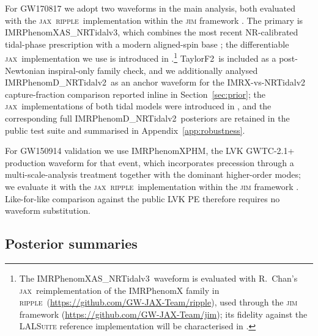 \documentclass[usenatbib]{mnras}
\newcommand{\IMR}{IMRPhenomD\_NRTidalv2\xspace}
\newcommand{\IMRX}{IMRPhenomXAS\_NRTidalv3\xspace}
\newcommand{\XPHM}{IMRPhenomXPHM\xspace}
\newcommand{\TF}{TaylorF2\xspace}
\newcommand{\jax}{\textsc{jax}\xspace}
\newcommand{\ripple}{\textsc{ripple}\xspace}
\begin{document}
For GW170817 we adopt two waveforms in the main analysis, both evaluated with the \jax\ \ripple\ implementation \citep{Edwards2023Ripple} within the \textsc{jim} framework \citep{Wong2023Jim}. The primary is \IMRX, which combines the most recent NR-calibrated tidal-phase prescription \citep[NRTidalv3;][]{Abac2024NRTidalv3} with a modern aligned-spin base \citep[IMRPhenomXAS;][]{Pratten2020XAS}; the differentiable \jax\ implementation we use is introduced in \citet{Chan2026ripple}.\footnote{\raggedright The \IMRX\ waveform is evaluated with R.~Chan's \jax\ reimplementation of the IMRPhenomX family in \ripple\ (\url{https://github.com/GW-JAX-Team/ripple}), used through the \textsc{jim} framework \citep{Wong2023Jim} (\url{https://github.com/GW-JAX-Team/jim}); its fidelity against the \textsc{LALSuite} reference implementation will be characterised in \citet{Chan2026ripple}.} \TF\ is included as a post-Newtonian inspiral-only family check, and we additionally analysed \IMR\ as an anchor waveform for the IMRX-vs-NRTidalv2 capture-fraction comparison reported inline in Section~\ref{sec:prior}; the \jax\ implementations of both tidal models were introduced in \citet{Wouters2024JimBNS}, and the corresponding full \IMR\ posteriors are retained in the public test suite and summarised in Appendix~\ref{app:robustness}.

For GW150914 validation we use \XPHM \citep{Pratten2021XPHM}, the LVK GWTC-2.1+ production waveform for that event, which incorporates precession through a multi-scale-analysis treatment together with the dominant higher-order modes; we evaluate it with the \jax\ \ripple\ implementation \citep{Edwards2023Ripple} within the \textsc{jim} framework \citep{Wong2023Jim}. Like-for-like comparison against the public LVK PE \citep{Abbott2021GWTC2p1,GWTC2p1_GW150914_Zenodo} therefore requires no waveform substitution.

\subsection{Posterior summaries}
\label{sec:summaries}
\end{document}
